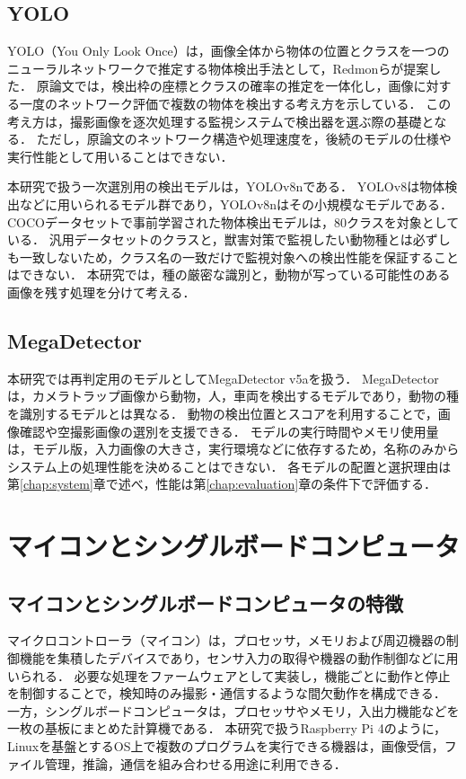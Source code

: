 \subsection{YOLO}
YOLO（You Only Look Once）は，画像全体から物体の位置とクラスを一つのニューラルネットワークで推定する物体検出手法として，Redmonら\cite{Redmon2016}が提案した．
原論文では，検出枠の座標とクラスの確率の推定を一体化し，画像に対する一度のネットワーク評価で複数の物体を検出する考え方を示している．
この考え方は，撮影画像を逐次処理する監視システムで検出器を選ぶ際の基礎となる．
ただし，原論文のネットワーク構造や処理速度を，後続のモデルの仕様や実行性能として用いることはできない．

本研究で扱う一次選別用の検出モデルは，YOLOv8nである．
YOLOv8は物体検出などに用いられるモデル群であり，YOLOv8nはその小規模なモデルである．
COCOデータセットで事前学習された物体検出モデルは，80クラスを対象としている\cite{UltralyticsYOLOv8}．
汎用データセットのクラスと，獣害対策で監視したい動物種とは必ずしも一致しないため，クラス名の一致だけで監視対象への検出性能を保証することはできない．
本研究では，種の厳密な識別と，動物が写っている可能性のある画像を残す処理を分けて考える．

\subsection{MegaDetector}
本研究では再判定用のモデルとしてMegaDetector v5aを扱う．
MegaDetectorは，カメラトラップ画像から動物，人，車両を検出するモデルであり，動物の種を識別するモデルとは異なる\cite{MegaDetectorDocs}．
動物の検出位置とスコアを利用することで，画像確認や空撮影画像の選別を支援できる\cite{Beery2019}．
モデルの実行時間やメモリ使用量は，モデル版，入力画像の大きさ，実行環境などに依存するため，名称のみからシステム上の処理性能を決めることはできない．
各モデルの配置と選択理由は第\ref{chap:system}章で述べ，性能は第\ref{chap:evaluation}章の条件下で評価する．

\section{マイコンとシングルボードコンピュータ}
\label{sec:background-computers}
\subsection{マイコンとシングルボードコンピュータの特徴}
マイクロコントローラ（マイコン）は，プロセッサ，メモリおよび周辺機器の制御機能を集積したデバイスであり，センサ入力の取得や機器の動作制御などに用いられる．
必要な処理をファームウェアとして実装し，機能ごとに動作と停止を制御することで，検知時のみ撮影・通信するような間欠動作を構成できる．
一方，シングルボードコンピュータは，プロセッサやメモリ，入出力機能などを一枚の基板にまとめた計算機である．
本研究で扱うRaspberry Pi 4のように，Linuxを基盤とするOS上で複数のプログラムを実行できる機器は，画像受信，ファイル管理，推論，通信を組み合わせる用途に利用できる\cite{RaspberryPiOS}．

